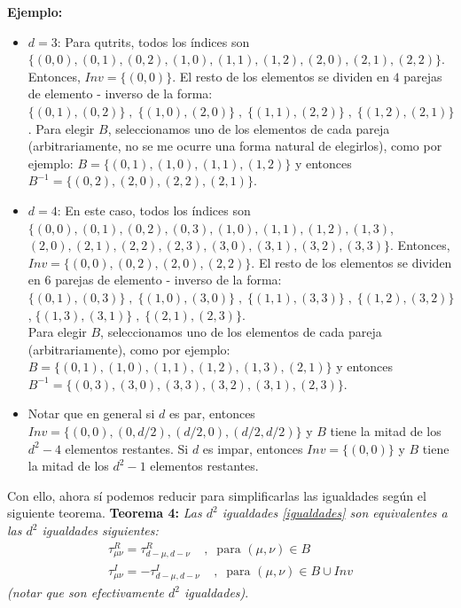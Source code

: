 \textbf{Ejemplo:}
\begin{itemize}
\item $d=3$: Para qutrits, todos los índices son $\{(0,0), (0,1), (0,2), (1,0) ,(1,1), (1,2), (2,0), (2,1), (2,2) \}$. Entonces, $Inv = \{(0,0)\}$. El resto de los elementos se dividen en $4$ parejas de elemento - inverso de la forma: $\{(0,1), (0,2)\} \; ,\; \{(1,0), (2,0)\} \; ,\; \{(1,1), (2,2)\} \; ,\; \{(1,2) , (2,1)\}$. Para elegir $B$, seleccionamos uno de los elementos de cada pareja (arbitrariamente, no se me ocurre una forma natural de elegirlos), como por ejemplo: $B = \{(0,1), (1,0), (1,1) ,(1,2)\}$ y entonces $B^{-1} = \{(0,2), (2,0), (2,2), (2,1)\}$.\\

\item $d=4$: En este caso, todos los índices son $\{(0,0), (0,1), (0,2),(0,3), (1,0) ,(1,1), (1,2),(1,3)$, $(2,0), (2,1), (2,2),(2,3) , (3,0), (3,1),(3,2), (3,3) \}$. Entonces, $Inv = \{(0,0), (0,2), (2,0), (2,2)\}$. El resto de los elementos se dividen en $6$ parejas de elemento - inverso de la forma: \\
$\{(0,1), (0,3)\} \; ,\; \{(1,0), (3,0)\} \; ,\; \{(1,1), (3,3)\} \; ,\; \{(1,2) , (3,2)\} \;$ ,$\; \{(1,3) , (3,1)\} \; ,\; \{(2,1), (2,3)\}$. \\
Para elegir $B$, seleccionamos uno de los elementos de cada pareja (arbitrariamente), como por ejemplo: $B = \{(0,1), (1,0), (1,1) ,(1,2), (1,3), (2,1)\}$ y entonces \\
$B^{-1} = \{(0,3) ,(3,0),(3,3),(3,2),(3,1),(2,3)\}$. \\
\item Notar que en general si $d$ es par, entonces $Inv = \{ (0,0) , (0,d/2), (d/2,0), (d/2,d/2)\}$ y $B$ tiene la mitad de los $d^2-4$ elementos restantes. Si $d$ es impar, entonces $Inv = \{(0,0)\}$ y $B$ tiene la mitad de los $d^2 - 1$ elementos restantes. 
\end{itemize}
Con ello, ahora sí podemos reducir para simplificarlas las igualdades según el siguiente teorema.
\textbf{Teorema 4:} \textit{Las $d^2$ igualdades \ref{igualdades} son equivalentes a las $d^2$ igualdades siguientes:}
\begin{align}
\tau_{\mu \nu}^R = \tau_{d-\mu, d-\nu}^R \;\;\;\; ,\;\; \text{para $(\mu,\nu) \in B$}
\label{ecs Re} \\
\tau_{\mu \nu}^I = - \tau^I_{d-\mu, d-\nu} \;\;\;\;,\;\; \text{para $(\mu , \nu) \in B \cup Inv $}
\label{ecs Im}
\end{align}
\textit{(notar que son efectivamente $d^2$ igualdades)}. \\


